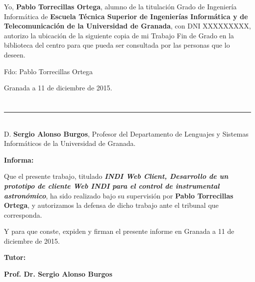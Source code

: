Yo, \textbf{Pablo Torrecillas Ortega}, alumno de la titulación Grado de Ingeniería Informática de  \textbf{Escuela Técnica Superior
de Ingenierías Informática y de Telecomunicación de la Universidad de Granada}, con DNI XXXXXXXXX, autorizo la
ubicación de la siguiente copia de mi Trabajo Fin de Grado en la biblioteca del centro para que pueda ser
consultada por las personas que lo deseen.

\vspace{6cm}

\noindent Fdo: Pablo Torrecillas Ortega

\vspace{2cm}

\begin{flushright}
Granada a 11 de diciembre de 2015.
\end{flushright}


\chapter*{}
\thispagestyle{empty}

\noindent\rule[-1ex]{\textwidth}{2pt}\\[4.5ex]

D. \textbf{Sergio Alonso Burgos}, Profesor del Departamento de Lenguajes y Sistemas Informáticos de la Universidad de Granada.

\vspace{0.5cm}

\textbf{Informa:}

\vspace{0.5cm}

Que el presente trabajo, titulado \textit{\textbf{INDI Web Client, Desarrollo de un prototipo de cliente Web INDI para el control de instrumental astronómico}},
ha sido realizado bajo su supervisión por \textbf{Pablo Torrecillas Ortega}, y autorizamos la defensa de dicho trabajo ante el tribunal
que corresponda.

\vspace{0.5cm}

Y para que conste, expiden y firman el presente informe en Granada a 11 de diciembre de 2015.

\vspace{1cm}

\textbf{Tutor:}

\vspace{5cm}

\noindent \textbf{Prof. Dr. Sergio Alonso Burgos }

